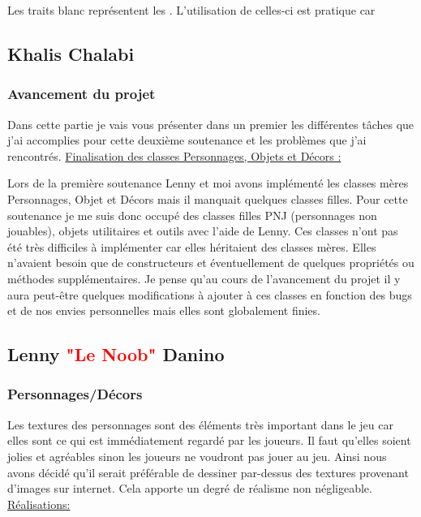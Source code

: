 \documentclass{article}
\begin{document}
Les traits blanc représentent les . L'utilisation de celles-ci est pratique car 

\newpage

\subsection{Khalis Chalabi}

\subsubsection{Avancement du projet}

\par
Dans cette partie je vais vous présenter dans un premier les différentes tâches que j'ai accomplies pour cette deuxième  soutenance et les problèmes que j'ai rencontrés.
\newline
\newline
\underline{Finalisation des classes Personnages, Objets et Décors :}

\par
Lors de la première soutenance Lenny et moi avons implémenté les classes mères Personnages, Objet et Décors mais il manquait quelques classes filles. Pour cette soutenance je me suis donc occupé des classes filles PNJ (personnages non jouables), objets utilitaires et outils avec l’aide de Lenny. Ces classes n’ont pas été très difficiles à implémenter car elles héritaient des classes mères. Elles n’avaient besoin que de constructeurs et éventuellement de quelques propriétés ou méthodes supplémentaires. Je pense qu’au cours de l’avancement du projet il y aura peut-être quelques modifications à ajouter à ces classes en fonction des bugs et de nos envies personnelles mais elles sont globalement finies.

\subsection{Lenny \textcolor{red}{"Le Noob"} Danino}
\subsubsection{Personnages/Décors}

\par
Les textures des personnages sont des éléments très important dans le jeu car elles sont ce qui est immédiatement regardé par les joueurs. Il faut qu’elles soient jolies et agréables sinon les joueurs ne voudront pas jouer au jeu. Ainsi nous avons décidé qu’il serait préférable de dessiner par-dessus des textures provenant d’images sur internet. Cela apporte un degré de réalisme non négligeable.
\newline
\newline
\underline{Réalisations:}
\end{document}
